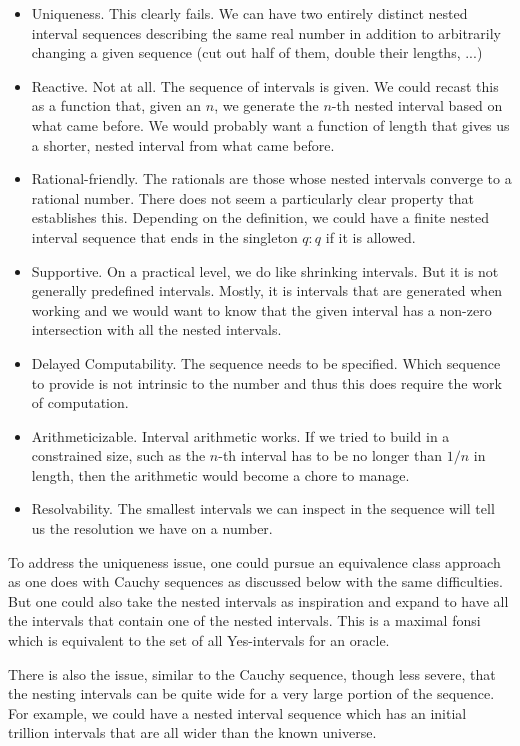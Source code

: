 \documentclass[12pt]{article}
\begin{document}
\begin{itemize}
    \item Uniqueness. This clearly fails. We can have two entirely distinct nested interval sequences describing the same real number in addition to arbitrarily changing a given sequence (cut out half of them, double their lengths, ...)
    \item Reactive. Not at all. The sequence of intervals is given. We could recast this as a function that, given an $n$, we generate the $n$-th nested interval based on what came before. We would probably want a function of length that gives us a shorter, nested interval from what came before. 
    \item Rational-friendly. The rationals are those whose nested intervals converge to a rational number. There does not seem a particularly clear property that establishes this. Depending on the definition, we could have a finite nested interval sequence that ends in the singleton $q:q$ if it is allowed. 
    \item Supportive. On a practical level, we do like shrinking intervals. But it is not generally predefined intervals. Mostly, it is intervals that are generated when working and we would want to know that the given interval has a non-zero intersection with all the nested intervals. 
    \item Delayed Computability. The sequence needs to be specified. Which sequence to provide is not intrinsic to the number and thus this does require the work of computation.  
    \item Arithmeticizable. Interval arithmetic works. If we tried to build in a constrained size, such as the $n$-th interval has to be no longer than $1/n$ in length, then the arithmetic would become a chore to manage. 
    \item Resolvability. The smallest intervals we can inspect in the sequence will tell us the resolution we have on a number. 
\end{itemize}

To address the uniqueness issue, one could pursue an equivalence class approach as one does with Cauchy sequences as discussed below with the same difficulties. But one could also take the nested intervals as inspiration and expand to have all the intervals that contain one of the nested intervals. This is a maximal fonsi which is equivalent to the set of all Yes-intervals for an oracle. 

There is also the issue, similar to the Cauchy sequence, though less severe, that the nesting intervals can be quite wide for a very large portion of the sequence.  For example, we could have a nested interval sequence which has an initial trillion intervals that are all wider than the known universe. 
\end{document}
